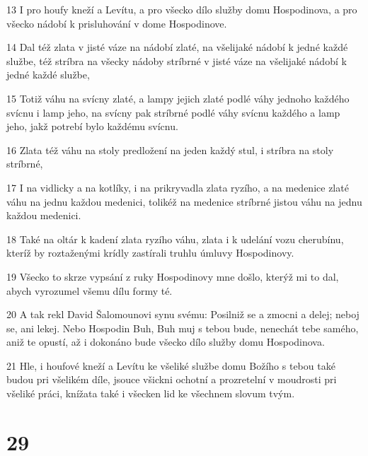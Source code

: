 \par 13 I pro houfy kneží a Levítu, a pro všecko dílo služby domu Hospodinova, a pro všecko nádobí k prisluhování v dome Hospodinove.
\par 14 Dal též zlata v jisté váze na nádobí zlaté, na všelijaké nádobí k jedné každé službe, též stríbra na všecky nádoby stríbrné v jisté váze na všelijaké nádobí k jedné každé službe,
\par 15 Totiž váhu na svícny zlaté, a lampy jejich zlaté podlé váhy jednoho každého svícnu i lamp jeho, na svícny pak stríbrné podlé váhy svícnu každého a lamp jeho, jakž potrebí bylo každému svícnu.
\par 16 Zlata též váhu na stoly predložení na jeden každý stul, i stríbra na stoly stríbrné,
\par 17 I na vidlicky a na kotlíky, i na prikryvadla zlata ryzího, a na medenice zlaté váhu na jednu každou medenici, tolikéž na medenice stríbrné jistou váhu na jednu každou medenici.
\par 18 Také na oltár k kadení zlata ryzího váhu, zlata i k udelání vozu cherubínu, kteríž by roztaženými krídly zastírali truhlu úmluvy Hospodinovy.
\par 19 Všecko to skrze vypsání z ruky Hospodinovy mne došlo, kterýž mi to dal, abych vyrozumel všemu dílu formy té.
\par 20 A tak rekl David Šalomounovi synu svému: Posilniž se a zmocni a delej; neboj se, ani lekej. Nebo Hospodin Buh, Buh muj s tebou bude, nenechát tebe samého, aniž te opustí, až i dokonáno bude všecko dílo služby domu Hospodinova.
\par 21 Hle, i houfové kneží a Levítu ke všeliké službe domu Božího s tebou také budou pri všelikém díle, jsouce všickni ochotní a prozretelní v moudrosti pri všeliké práci, knížata také i všecken lid ke všechnem slovum tvým.

\chapter{29}

